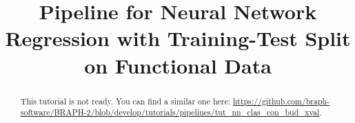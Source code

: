 \documentclass[justified]{tufte-handout}
\title[Regression Training-Test Split Functional Data]{Pipeline for Neural Network Regression with Training-Test Split on Functional Data}
\begin{document}
\maketitle

\begin{abstract}
\noindent
This tutorial is not ready. You can find a similar one here: \url{https://github.com/braph-software/BRAPH-2/blob/develop/tutorials/pipelines/tut_nn_clas_con_bud_xval}.
\end{abstract}
\end{document}

